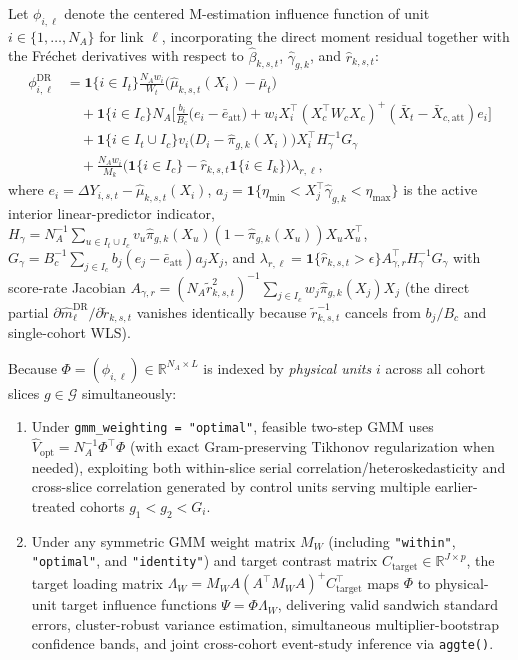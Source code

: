\documentclass[11pt]{article}
\theoremstyle{definition}
\theoremstyle{remark}
\begin{document}
Let $\phi_{i,\ell}$ denote the centered M-estimation influence function of unit $i \in \{1,\dots,N_A\}$ for link $\ell$, incorporating the direct moment residual together with the Fr\'echet derivatives with respect to $\hat{\beta}_{k,s,t}$, $\hat{\gamma}_{g,k}$, and $\hat{r}_{k,s,t}$:
\begin{align*}
\phi_{i,\ell}^{\mathrm{DR}} &= \mathbf{1}\{i \in I_t\} \frac{N_A w_i}{W_t}\bigl(\hat{\mu}_{k,s,t}(X_i) - \bar{\mu}_t\bigr) \\
&\quad + \mathbf{1}\{i \in I_c\} N_A \biggl[\frac{b_i}{B_c}\bigl(e_i - \bar{e}_{\mathrm{att}}\bigr) + w_i X_i^\top (X_c^\top W_c X_c)^+(\bar{X}_t - \bar{X}_{c,\mathrm{att}}) e_i\biggr] \\
&\quad + \mathbf{1}\{i \in I_t \cup I_c\} v_i \bigl(D_i - \hat{\pi}_{g,k}(X_i)\bigr) X_i^\top H_{\gamma}^{-1} G_{\gamma} \\
&\quad + \frac{N_A w_i}{M_k}\bigl(\mathbf{1}\{i \in I_c\} - \hat{r}_{k,s,t}\mathbf{1}\{i \in I_k\}\bigr)\lambda_{r,\ell},
\end{align*}
where $e_i = \Delta Y_{i,s,t} - \hat{\mu}_{k,s,t}(X_i)$, $a_j = \mathbf{1}\{\eta_{\min} < X_j^\top \hat{\gamma}_{g,k} < \eta_{\max}\}$ is the active interior linear-predictor indicator, $H_\gamma = N_A^{-1}\sum_{u \in I_t \cup I_c} v_u \hat{\pi}_{g,k}(X_u)(1-\hat{\pi}_{g,k}(X_u))X_u X_u^\top$, $G_\gamma = B_c^{-1}\sum_{j \in I_c} b_j (e_j - \bar{e}_{\mathrm{att}}) a_j X_j$, and $\lambda_{r,\ell} = \mathbf{1}\{\hat{r}_{k,s,t} > \epsilon\} A_{\gamma,r}^\top H_\gamma^{-1} G_\gamma$ with score-rate Jacobian $A_{\gamma,r} = (N_A \tilde{r}_{k,s,t}^2)^{-1}\sum_{j \in I_c} w_j \hat{\pi}_{g,k}(X_j) X_j$ (the direct partial $\partial \hat{m}_\ell^{\mathrm{DR}} / \partial \tilde{r}_{k,s,t}$ vanishes identically because $\tilde{r}_{k,s,t}^{-1}$ cancels from $b_j / B_c$ and single-cohort WLS).

Because $\Phi = (\phi_{i,\ell}) \in \mathbb{R}^{N_A \times L}$ is indexed by \emph{physical units} $i$ across all cohort slices $g \in \mathcal{G}$ simultaneously:
\begin{enumerate}
\item Under \texttt{gmm\_weighting = "optimal"}, feasible two-step GMM uses $\widehat{V}_{\mathrm{opt}} = N_A^{-1} \Phi^\top \Phi$ (with exact Gram-preserving Tikhonov regularization when needed), exploiting both within-slice serial correlation/heteroskedasticity and cross-slice correlation generated by control units serving multiple earlier-treated cohorts $g_1 < g_2 < G_i$.
\item Under any symmetric GMM weight matrix $M_W$ (including \texttt{"within"}, \texttt{"optimal"}, and \texttt{"identity"}) and target contrast matrix $C_{\mathrm{target}} \in \mathbb{R}^{J \times p}$, the target loading matrix $\Lambda_W = M_W A (A^\top M_W A)^+ C_{\mathrm{target}}^\top$ maps $\Phi$ to physical-unit target influence functions $\Psi = \Phi \Lambda_W$, delivering valid sandwich standard errors, cluster-robust variance estimation, simultaneous multiplier-bootstrap confidence bands, and joint cross-cohort event-study inference via \texttt{aggte()}.
\end{enumerate}
\end{document}
